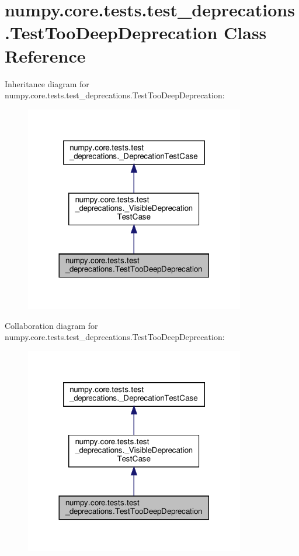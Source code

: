 \hypertarget{classnumpy_1_1core_1_1tests_1_1test__deprecations_1_1TestTooDeepDeprecation}{}\section{numpy.\+core.\+tests.\+test\+\_\+deprecations.\+Test\+Too\+Deep\+Deprecation Class Reference}
\label{classnumpy_1_1core_1_1tests_1_1test__deprecations_1_1TestTooDeepDeprecation}


Inheritance diagram for numpy.\+core.\+tests.\+test\+\_\+deprecations.\+Test\+Too\+Deep\+Deprecation\+:
\nopagebreak
\begin{figure}[H]
\begin{center}
\leavevmode
\includegraphics[width=272pt]{classnumpy_1_1core_1_1tests_1_1test__deprecations_1_1TestTooDeepDeprecation__inherit__graph}
\end{center}
\end{figure}


Collaboration diagram for numpy.\+core.\+tests.\+test\+\_\+deprecations.\+Test\+Too\+Deep\+Deprecation\+:
\nopagebreak
\begin{figure}[H]
\begin{center}
\leavevmode
\includegraphics[width=272pt]{classnumpy_1_1core_1_1tests_1_1test__deprecations_1_1TestTooDeepDeprecation__coll__graph}
\end{center}
\end{figure}
